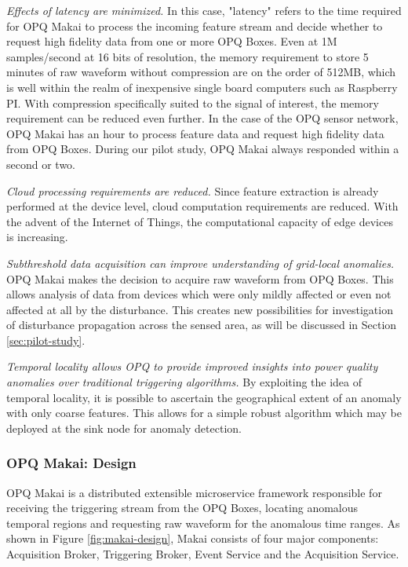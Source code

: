 {\em Effects of latency are minimized.} In this case, "latency" refers to the time required for OPQ Makai to process the incoming feature stream and decide whether to request high fidelity data from one or more OPQ Boxes. Even at 1M samples/second at 16 bits of resolution, the memory requirement to store 5 minutes of raw waveform without compression are on the order of 512MB, which is well within the realm of inexpensive single board computers such as Raspberry PI. With compression specifically suited to the signal of interest, the memory requirement can be reduced even further. In the case of the OPQ sensor network, OPQ Makai has an hour to process feature data and request high fidelity data from OPQ Boxes. During our pilot study, OPQ Makai always responded within a second or two.

{\em Cloud processing requirements are reduced.} Since feature extraction is already performed at the device level, cloud computation requirements are reduced. With the advent of the Internet of Things, the computational capacity of edge devices is increasing.

{\em Subthreshold data acquisition can improve understanding of grid-local anomalies.} OPQ Makai makes the decision to acquire raw waveform from OPQ Boxes. This allows analysis of data from devices which were only mildly affected or even not affected at all by the disturbance. This creates new possibilities for investigation of disturbance propagation across the sensed area, as will be discussed in Section \ref{sec:pilot-study}.

{\em Temporal locality allows OPQ to provide improved insights into power quality anomalies over traditional triggering algorithms.} By exploiting the idea of temporal locality, it is possible to ascertain the geographical extent of an anomaly with only coarse features. This allows for a simple robust algorithm which may be deployed at the sink node for anomaly detection.

\subsubsection{OPQ Makai: Design}

OPQ Makai is a distributed extensible microservice framework responsible for receiving the triggering stream from the OPQ Boxes, locating anomalous temporal regions and requesting raw waveform for the anomalous time ranges. As shown in Figure \ref{fig:makai-design}, Makai consists of four major components: Acquisition Broker, Triggering Broker, Event Service and the Acquisition Service.

